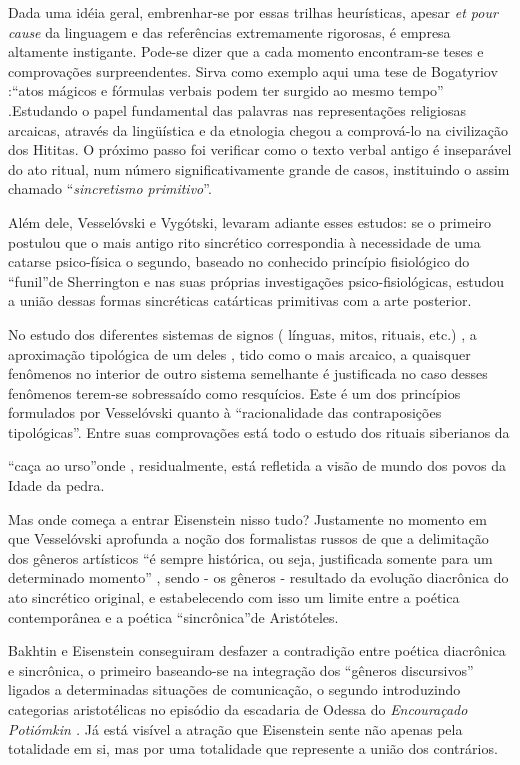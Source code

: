 Dada uma idéia geral, embrenhar-se por essas trilhas heurísticas, apesar
\emph{et pour cause} da linguagem e das referências extremamente
rigorosas, é empresa altamente instigante. Pode-se dizer que a cada
momento encontram-se teses e comprovações surpreendentes. Sirva como
exemplo aqui uma tese de Bogatyriov :``atos mágicos e fórmulas verbais
podem ter surgido ao mesmo tempo'' .Estudando o papel fundamental das
palavras nas representações religiosas arcaicas, através da lingüística
e da etnologia chegou a comprová-lo na civilização dos Hititas. O
próximo passo foi verificar como o texto verbal antigo é inseparável do
ato ritual, num número significativamente grande de casos, instituindo o
assim chamado ``\emph{sincretismo primitivo}''.

Além dele, Vesselóvski e Vygótski, levaram adiante esses estudos: se o
primeiro postulou que o mais antigo rito sincrético correspondia à
necessidade de uma catarse psico-física o segundo, baseado no conhecido
princípio fisiológico do ``funil''de Sherrington e nas suas próprias
investigações psico-fisiológicas, estudou a união dessas formas
sincréticas catárticas primitivas com a arte posterior.

No estudo dos diferentes sistemas de signos ( línguas, mitos, rituais,
etc.) , a aproximação tipológica de um deles , tido como o mais arcaico,
a quaisquer fenômenos no interior de outro sistema semelhante é
justificada no caso desses fenômenos terem-se sobressaído como
resquícios. Este é um dos princípios formulados por Vesselóvski quanto à
``racionalidade das contraposições tipológicas''. Entre suas
comprovações está todo o estudo dos rituais siberianos da

``caça ao urso''onde , residualmente, está refletida a visão de mundo
dos povos da Idade da pedra.

Mas onde começa a entrar Eisenstein nisso tudo? Justamente no momento em
que Vesselóvski aprofunda a noção dos formalistas russos de que a
delimitação dos gêneros artísticos ``é sempre histórica, ou seja,
justificada somente para um determinado momento'' , sendo - os gêneros -
resultado da evolução diacrônica do ato sincrético original, e
estabelecendo com isso um limite entre a poética contemporânea e a
poética ``sincrônica''de Aristóteles.

Bakhtin e Eisenstein conseguiram desfazer a contradição entre poética
diacrônica e sincrônica, o primeiro baseando-se na integração dos
``gêneros discursivos'' ligados a determinadas situações de comunicação,
o segundo introduzindo categorias aristotélicas no episódio da escadaria
de Odessa do \emph{Encouraçado Potiómkin .} Já está visível a atração
que Eisenstein sente não apenas pela totalidade em si, mas por uma
totalidade que represente a união dos contrários.

